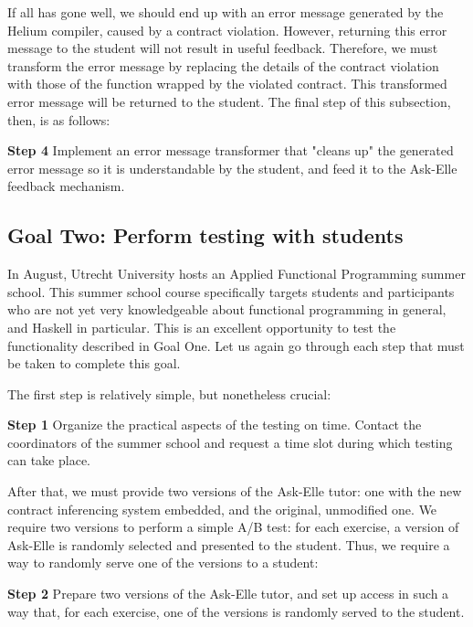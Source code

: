 \documentclass[10pt]{report}
\begin{document}
If all has gone well, we should end up with an error message generated by the Helium compiler, caused by a contract violation.
However, returning this error message to the student will not result in useful feedback.
Therefore, we must transform the error message by replacing the details of the contract violation with those of the function wrapped by the violated contract.
This transformed error message will be returned to the student. The final step of this subsection, then, is as follows:

\begin{description}
	\item{\textbf{Step 4}} Implement an error message transformer that "cleans up" the generated error message so it is understandable by the student, and feed it to the Ask-Elle feedback mechanism.
\end{description}

\subsection{Goal Two: Perform testing with students}

In August, Utrecht University hosts an Applied Functional Programming summer school.
This summer school course specifically targets students and participants who are not yet very knowledgeable about functional programming in general, and Haskell in particular.
This is an excellent opportunity to test the functionality described in Goal One.
Let us again go through each step that must be taken to complete this goal.

The first step is relatively simple, but nonetheless crucial:

\begin{description}
	\item{\textbf{Step 1}} Organize the practical aspects of the testing on time. Contact the coordinators of the summer school and request a time slot during which testing can take place.
\end{description}

After that, we must provide two versions of the Ask-Elle tutor: one with the new contract inferencing system embedded, and the original, unmodified one.
We require two versions to perform a simple A/B test: for each exercise, a version of Ask-Elle is randomly selected and presented to the student.
Thus, we require a way to randomly serve one of the versions to a student:

\begin{description}
	\item{\textbf{Step 2}} Prepare two versions of the Ask-Elle tutor, and set up access in such a way that, for each exercise, one of the versions is randomly served to the student.
\end{description}
\end{document}
